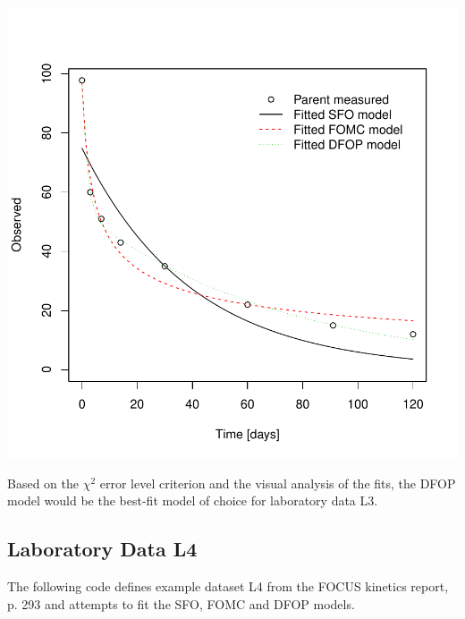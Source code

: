 \documentclass[12pt,a4paper]{article}
\begin{document}
\includegraphics{examples-FOCUS_2006_L3_2}

Based on the $\chi^2$ error level criterion and the visual analysis of the
fits, the DFOP model would be the best-fit model of choice for laboratory data
L3.

\subsection{Laboratory Data L4}

The following code defines example dataset L4 from the FOCUS kinetics
report, p. 293 and attempts to fit the SFO, FOMC and DFOP models.
\end{document}
